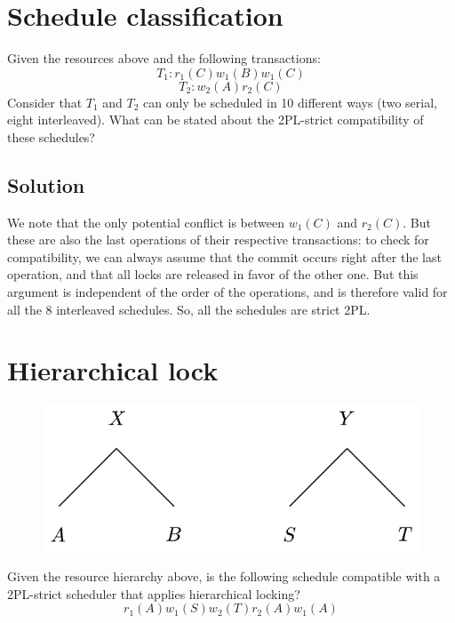 \documentclass[12pt, a4paper]{report}
\newtheorem[style=M,bodystyle=\normalfont]{theorem}{Theorem}
\newtheorem[style=M,bodystyle=\normalfont]{corollary}{Corollary}
\newtheorem[style=M,bodystyle=\normalfont]{lemma}{Lemma}
\newtheorem[style=M,bodystyle=\normalfont]{definition}{Definition}
\begin{document}
    \section{Schedule classification}
        Given the resources above and the following transactions:
        \[T_1: r_1(C) w_1(B) w_1(C)\] 
        \[T_2: w_2(A) r_2(C)\]
        Consider that $T_1$ and $T_2$ can only be scheduled in 10 different ways (two serial, eight interleaved). What can be stated about 
        the 2PL-strict compatibility of these schedules? 
    \subsection*{Solution}
        We note that the only potential conflict is between $w_1(C)$ and $r_2(C)$. But these are also the last operations of their respective 
        transactions: to check for compatibility, we can always assume that the commit occurs right after the last operation, and that all 
        locks are released in favor of the other one. But this argument is independent of the order of the operations, and is therefore valid 
        for all the 8 interleaved schedules. So, all the schedules are strict 2PL. 

    \newpage

    \section{Hierarchical lock}
        \begin{figure}[H]
            \centering
            \includegraphics[width=0.4\linewidth]{images/HL1.png}
        \end{figure}
        Given the resource hierarchy above, is the following schedule compatible with a 2PL-strict scheduler that applies hierarchical locking?
        \[r_1(A) w_1(S) w_2(T) r_2(A) w_1(A)\]
\end{document}
